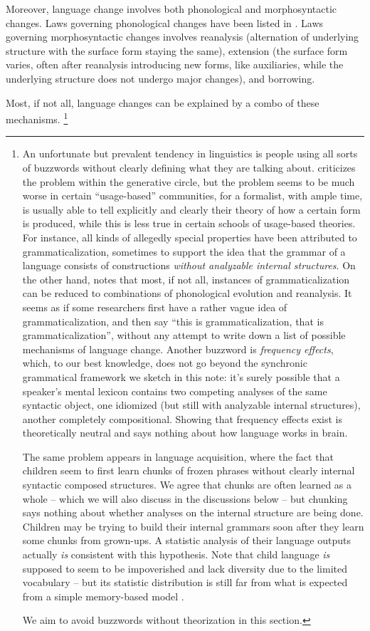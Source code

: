 \documentclass[a4paper, oneside, scheme=plain, 12pt]{article}
\newcommand*{\citepages}[1]{pp.~{#1}}
\newcommand*{\term}[1]{\emph{#1}}
\begin{document}
Moreover, language change involves both phonological and morphosyntactic changes.
Laws governing phonological changes have been listed in .
Laws governing morphosyntactic changes involves reanalysis (alternation of underlying structure with the surface form staying the same), extension (the surface form varies, often after reanalysis introducing new forms, like auxiliaries, while the underlying structure does not undergo major changes), and borrowing.

Most, if not all, language changes can be explained by a combo of these mechanisms.%
\footnote{
    An unfortunate but prevalent tendency in linguistics is
    people using all sorts of buzzwords without clearly defining what they are talking about.
    \citet{dixon2009basic1} criticizes the problem within the generative circle,
    but the problem seems to be much worse in certain ``usage-based'' communities,
    for a formalist, with ample time, is usually able to tell explicitly and clearly their theory of how a certain form is produced,
    while this is less true in certain schools of usage-based theories.
    For instance, all kinds of allegedly special properties have been attributed to grammaticalization,
    sometimes to support the idea that the grammar of a language consists of 
    constructions \emph{without analyzable internal structures}.
    On the other hand, \citet[\citepages{284-285}]{campbell2013historical}
    notes that most, if not all, instances of grammaticalization can be reduced to combinations of 
    phonological evolution and reanalysis.
    It seems as if some researchers first have a rather vague idea of grammaticalization,
    and then say ``this is grammaticalization, that is grammaticalization'',
    without any attempt to write down a list of possible mechanisms of language change.
    Another buzzword is \term{frequency effects}, which, to our best knowledge,
    does not go beyond the synchronic grammatical framework we sketch in this note:
    it's surely possible that a speaker's mental lexicon contains two competing analyses
    of the same syntactic object, one idiomized (but still with analyzable internal structures),
    another completely compositional.
    Showing that frequency effects exist is theoretically neutral and says nothing about how language works in brain.

    The same problem appears in language acquisition,
    where the fact that children seem to first learn chunks of frozen phrases
    without clearly internal syntactic composed structures.
    We agree that chunks are often learned as a whole --
    which we will also discuss in the discussions below --
    but chunking says nothing about whether analyses on the internal structure are being done.
    Children may be trying to build their internal grammars soon after they learn some chunks from grown-ups.
    A statistic analysis of their language outputs actually \emph{is} consistent with this hypothesis.
    Note that child language \emph{is} supposed to seem to be impoverished and lack diversity
    due to the limited vocabulary -- but its statistic distribution is still
    far from what is expected from a simple memory-based model \citep{yang2013ontogeny}.

    We aim to avoid buzzwords without theorization in this section.
}
\end{document}
